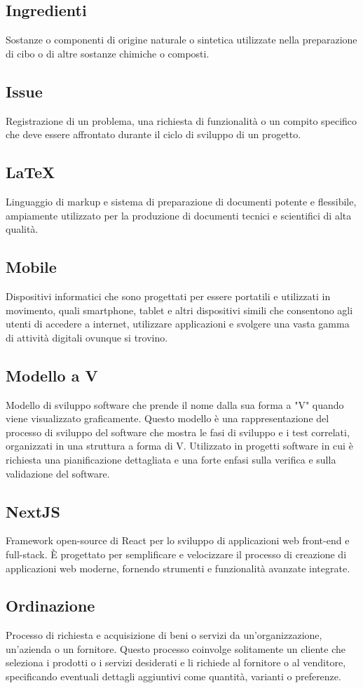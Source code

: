 \subsection{Ingredienti}Sostanze o componenti di origine naturale o sintetica utilizzate nella preparazione di cibo o di altre sostanze chimiche o composti.
\subsection{Issue}Registrazione di un problema, una richiesta di funzionalità o un compito specifico che deve essere affrontato durante il ciclo di sviluppo di un progetto.
\subsection{LaTeX}Linguaggio di markup e sistema di preparazione di documenti potente e flessibile, ampiamente utilizzato per la produzione di documenti tecnici e scientifici di alta qualità.
\subsection{Mobile}Dispositivi informatici che sono progettati per essere portatili e utilizzati in movimento, quali smartphone, tablet e altri dispositivi simili che consentono agli utenti di accedere a internet, utilizzare applicazioni e svolgere una vasta gamma di attività digitali ovunque si trovino.
\subsection{Modello a V}Modello di sviluppo software che prende il nome dalla sua forma a "V" quando viene visualizzato graficamente. Questo modello è una rappresentazione del processo di sviluppo del software che mostra le fasi di sviluppo e i test correlati, organizzati in una struttura a forma di V. Utilizzato in progetti software in cui è richiesta una pianificazione dettagliata e una forte enfasi sulla verifica e sulla validazione del software.
\subsection{NextJS}Framework open-source di React per lo sviluppo di applicazioni web front-end e full-stack. È progettato per semplificare e velocizzare il processo di creazione di applicazioni web moderne, fornendo strumenti e funzionalità avanzate integrate.
\subsection{Ordinazione}Processo di richiesta e acquisizione di beni o servizi da un'organizzazione, un'azienda o un fornitore. Questo processo coinvolge solitamente un cliente che seleziona i prodotti o i servizi desiderati e li richiede al fornitore o al venditore, specificando eventuali dettagli aggiuntivi come quantità, varianti o preferenze.
